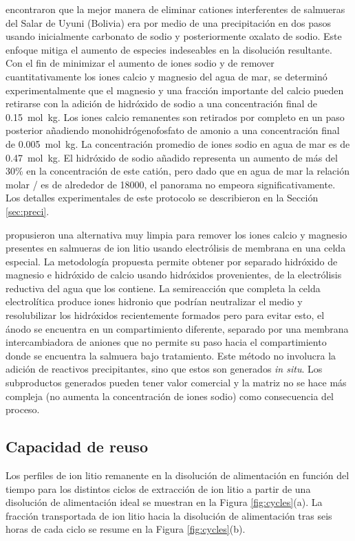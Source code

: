\citet{AN2012b} encontraron que la mejor manera de eliminar cationes interferentes de salmueras del Salar de Uyuni (Bolivia) era por medio de una precipitación en dos pasos usando inicialmente carbonato de sodio y posteriormente oxalato de sodio. Este enfoque mitiga el aumento de especies indeseables en la disolución resultante. Con el fin de minimizar el aumento de iones sodio y de remover cuantitativamente los iones calcio y magnesio del agua de mar, se determinó experimentalmente que el magnesio y una fracción importante del calcio pueden retirarse con la adición de hidróxido de sodio a una concentración final de 0.15~mol~kg\mnn. Los iones calcio remanentes son retirados por completo en un paso posterior añadiendo monohidrógenofosfato de amonio a una concentración final de 0.005~mol~kg\mnn. La concentración promedio de iones sodio en agua de mar es de 0.47~mol~kg\mnn \citep{Dickson1994}. El hidróxido de sodio añadido representa un aumento de más del 30\% en la concentración de este catión, pero dado que en agua de mar la relación molar / es de alrededor de 18000, el panorama no empeora significativamente. Los detalles experimentales de este protocolo se describieron en la Sección \ref{sec:preci}.

\citet{Diaz2019} propusieron una alternativa muy limpia para remover los iones calcio y magnesio presentes en salmueras de ion litio usando electrólisis de membrana en una celda especial. La metodología propuesta permite obtener por separado hidróxido de magnesio e hidróxido de calcio usando hidróxidos provenientes, de la electrólisis reductiva del agua que los contiene. La semireacción que completa la celda electrolítica produce iones hidronio que podrían neutralizar el medio y resolubilizar los hidróxidos recientemente formados pero para evitar esto, el ánodo se encuentra en un compartimiento diferente, separado por una membrana intercambiadora de aniones que no permite su paso hacia el compartimiento donde se encuentra la salmuera bajo tratamiento. Este método no involucra la adición de reactivos precipitantes, sino que estos son generados \textit{in situ}. Los subproductos generados pueden tener valor comercial y la matriz no se hace más compleja (no aumenta la concentración de iones sodio) como consecuencia del proceso. 

\subsection{Capacidad de reuso}\label{sec:reuseres}
Los perfiles de ion litio remanente en la disolución de alimentación en función del tiempo para los distintos ciclos de extracción de ion litio a partir de una disolución de alimentación ideal se muestran en la Figura \ref{fig:cycles}(a). La fracción transportada de ion litio hacia la disolución de alimentación tras seis horas de cada ciclo se resume en la Figura \ref{fig:cycles}(b).


